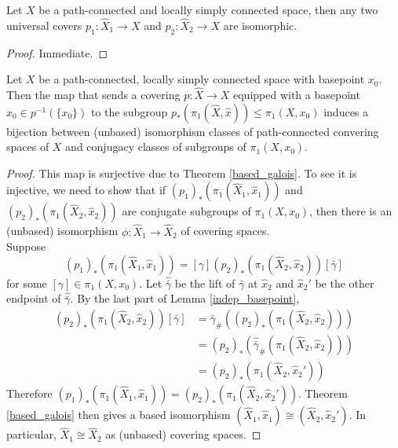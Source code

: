 \begin{corollary}
    Let $X$ be a path-connected and locally simply connected space, then any two universal covers $p_1:\hat{X}_1\to X$ and $p_2:\hat{X}_2\to X$ are isomorphic.
\end{corollary}
\begin{proof}
    Immediate.
\end{proof}
\begin{corollary}\label{unbased_galois}
    Let $X$ be a path-connected, locally simply connected space with basepoint $x_0$.
    Then the map that sends a covering $p:\hat{X}\to X$ equipped with a basepoint $\hat{x}_0\in p^{-1}(\{x_0\})$ to the subgroup $p_\ast(\pi_1(\hat{X},\hat{x}))\le\pi_1(X,x_0)$ induces a bijection between (unbased) isomorphism classes of path-connected convering spaces of $X$ and conjugacy classes of subgroups of $\pi_1(X,x_0)$.
\end{corollary}
\begin{proof}
    This map is surjective due to Theorem \ref{based_galois}.
    To see it is injective, we need to show that if $(p_1)_\ast(\pi_1(\hat{X}_1,\hat{x}_1))$ and $(p_2)_\ast(\pi_1(\hat{X}_2,\hat{x}_2))$ are conjugate subgroups of $\pi_1(X,x_0)$, then there is an (unbased) isomorphism $\phi:\hat{X}_1\to\hat{X}_2$ of covering spaces.\\
    Suppose
    $$(p_1)_\ast(\pi_1(\hat{X}_1,\hat{x}_1))=[\gamma](p_2)_\ast(\pi_1(\hat{X}_2,\hat{x}_2))[\bar\gamma]$$
    for some $[\gamma]\in\pi_1(X,x_0)$.
    Let $\widehat{\bar{\gamma}}$ be the lift of $\bar\gamma$ at $\hat{x}_2$ and $\hat{x}_2'$ be the other endpoint of $\widehat{\bar\gamma}$.
    By the last part of Lemma \ref{indep_basepoint},
    \begin{align*}
        [\gamma](p_2)_\ast(\pi_1(\hat{X}_2,\hat{x}_2))[\bar\gamma]&=\bar\gamma_\#((p_2)_\ast(\pi_1(\hat{X}_2,\hat{x}_2)))\\
        &=(p_2)_\ast(\widehat{\bar\gamma}_\#(\pi_1(\hat{X}_2,\hat{x}_2)))\\
        &=(p_2)_\ast(\pi_1(\hat{X}_2,\hat{x}_2'))
    \end{align*}
    Therefore $(p_1)_\ast(\pi_1(\hat{X}_1,\hat{x}_1))=(p_2)_\ast(\pi_1(\hat{X}_2,\hat{x}_2'))$.
    Theorem \ref{based_galois} then gives a based isomorphism $(\hat{X}_1,\hat{x}_1)\cong(\hat{X}_2,\hat{x}_2')$.
    In particular, $\hat{X}_1\cong\hat{X}_2$ as (unbased) covering spaces.
\end{proof}
